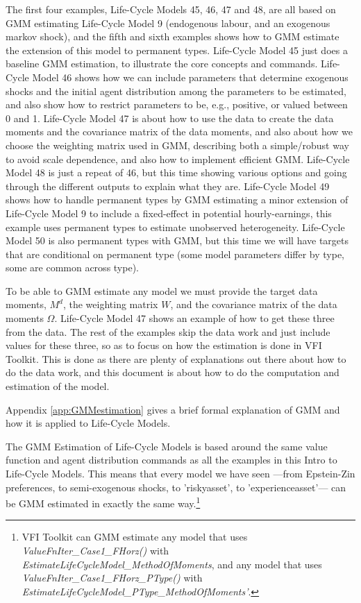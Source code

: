 The first four examples, Life-Cycle Models 45, 46, 47 and 48, are all based on GMM estimating Life-Cycle Model 9 (endogenous labour, and an exogenous markov shock), and the fifth and sixth examples shows how to GMM estimate the extension of this model to permanent types. Life-Cycle Model 45 just does a baseline GMM estimation, to illustrate the core concepts and commands. Life-Cycle Model 46 shows how we can include parameters that determine exogenous shocks and the initial agent distribution among the parameters to be estimated, and also show how to restrict parameters to be, e.g., positive, or valued between 0 and 1. Life-Cycle Model 47 is about how to use the data to create the data moments and the covariance matrix of the data moments, and also about how we choose the weighting matrix used in GMM, describing both a simple/robust way to avoid scale dependence, and also how to implement efficient GMM. Life-Cycle Model 48 is just a repeat of 46, but this time showing various options and going through the different outputs to explain what they are. Life-Cycle Model 49 shows how to handle permanent types by GMM estimating a minor extension of Life-Cycle Model 9 to include a fixed-effect in potential hourly-earnings, this example uses permanent types to estimate unobserved heterogeneity. Life-Cycle Model 50 is also permanent types with GMM, but this time we will have targets that are conditional on permanent type (some model parameters differ by type, some are common across type).


To be able to GMM estimate any model we must provide the target data moments, $M^d$, the weighting matrix $W$, and the covariance matrix of the data moments $\Omega$. Life-Cycle Model 47 shows an example of how to get these three from the data. The rest of the examples skip the data work and just include values for these three, so as to focus on how the estimation is done in VFI Toolkit. This is done as there are plenty of explanations out there about how to do the data work, and this document is about how to do the computation and estimation of the model.

Appendix \ref{app:GMMestimation} gives a brief formal explanation of GMM and how it is applied to Life-Cycle Models.

The GMM Estimation of Life-Cycle Models is based around the same value function and agent distribution commands as all the examples in this Intro to Life-Cycle Models. This means that every model we have seen ---from Epstein-Zin preferences, to semi-exogenous shocks, to 'riskyasset', to 'experienceasset'--- can be GMM estimated in exactly the same way.\footnote{VFI Toolkit can GMM estimate any model that uses \textit{ValueFnIter\_{}Case1\_{}FHorz()} with \textit{EstimateLifeCycleModel\_{}MethodOfMoments}, and any model that uses \textit{ValueFnIter\_{}Case1\_{}FHorz\_{}PType()} with \textit{EstimateLifeCycleModel\_{}PType\_{}MethodOfMoments'}.}


